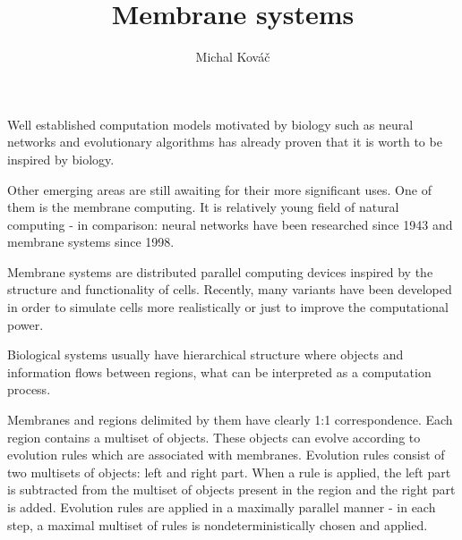 \documentclass{svk_short_en}
\begin{document}
\title{Membrane systems}

\author{Michal Kováč
}




\maketitle

Well established computation models motivated by biology such as neural networks and evolutionary algorithms has already proven that it is worth to be inspired by biology.

Other emerging areas are still awaiting for their more significant uses. One of them is the membrane computing. It is relatively young field of natural computing - in comparison: neural networks have been researched since 1943 and membrane systems since 1998. \cite{Paun98}

Membrane systems are distributed parallel computing devices inspired by the structure and functionality of cells. Recently, many variants have been developed in order to simulate cells more realistically or just to improve the computational power.


Biological systems usually have hierarchical structure where objects and information flows between regions, what can be interpreted as a computation process.

Membranes and regions delimited by them have clearly 1:1 correspondence. Each region contains a multiset of objects. These objects can evolve according to evolution rules which are associated with membranes. Evolution rules consist of two multisets of objects: left and right part. When a rule is applied, the left part is subtracted from the multiset of objects present in the region and the right part is added. Evolution rules are applied in a maximally parallel manner - in each step, a maximal multiset of rules is nondeterministically chosen and applied.
\end{document}
